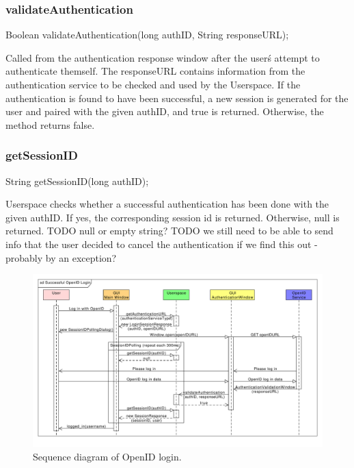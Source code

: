 \subsubsection{validateAuthentication}
    Boolean validateAuthentication(long authID, String responseURL);

Called from the authentication response window after the user\'s attempt to authenticate themself.
The responseURL contains information from the authentication service to be checked and used by the Userspace.
If the authentication is found to have been successful, a new session is generated for the user and paired with the given authID, and true is returned.
Otherwise, the method returns false.

\subsubsection{getSessionID}
    String getSessionID(long authID);

Userspace checks whether a successful authentication has been done with the given authID.
If yes, the corresponding session id is returned.
Otherwise, null is returned.
TODO null or empty string?
TODO we still need to be able to send info that the user decided to cancel the authentication if we find this out - probably by an exception?

\begin{figure}[h]
\begin{center}
\includegraphics[scale=0.55, angle=90]{figures/openid_login_sequence.pdf}
\end{center}
\caption{Sequence diagram of OpenID login.}\label{gui:sd:openid_login}
\end{figure}
